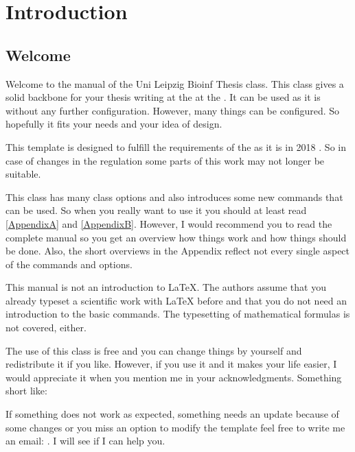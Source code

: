 \chapter{Introduction}%
\label{Chapter1} %

\section{Welcome}

Welcome to the manual of the Uni Leipzig Bioinf Thesis class. This class gives
a solid backbone for your thesis writing at the 
at the . It can be used as it is without any further
configuration. However, many things can be configured. So hopefully it fits
your needs and your idea of design.

This template is designed to fulfill the requirements of the
 as it is in 2018
\citep{web:promotion,web:promotion2}. So in case of changes in the regulation
some parts of this work may not longer be suitable.

This class has many class options and also introduces some new commands that
can be used. So when you really want to use it you should at least read
\autoref{AppendixA} and \autoref{AppendixB}. However, I would recommend you to
read the complete manual so you get an overview how things work and how things
should be done. Also, the short overviews in the Appendix reflect not every
single aspect of the commands and options.

This manual is not an introduction to \LaTeX. The authors assume that you
already typeset a scientific work with \LaTeX{} before and that you do not
need an introduction to the basic commands. The typesetting of mathematical
formulas is not covered, either.

The use of this class is free and you can change things by yourself and
redistribute it if you like. However, if you use it and it makes your life
easier, I would appreciate it when you mention me in your acknowledgments.
Something short like: 

If something does not work as expected, something needs an update because of
some changes or you miss an option to modify the template feel free to write
me an email: .  I will see if I can help
you.

